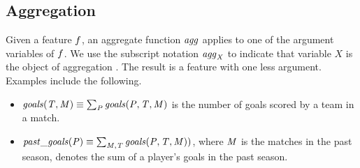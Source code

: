 \documentclass[conference]{IEEEtran}
\newcommand{\team}{T}
\newcommand{\player}{P}
\newcommand{\match}{M}
\newcommand{\plusminus}{\mbox{+/-}}
\newcommand{\aggregate}{\it{agg}}
\begin{document}
\subsection{Aggregation} Given a feature $f$, an aggregate function $\aggregate$ applies to one of the argument variables of $f$. We use the subscript notation $\aggregate_{X}$ to indicate that variable $X$ is the object of aggregation \cite{Popescul2007}. The result is a feature with one less argument. Examples include the following.

\begin{itemize}
\item $\it{goals}(\team,\match) \equiv \sum_{\player} \it{goals}(\player,\team,\match)$ is the number of goals scored by a team in a match.
\item $\it{past}\_\it{goals}(\player) \equiv \sum_{\match,\team %
} \it{goals}(\player,\team,\match))$, where $\it{M}$ is the matches in the past season, denotes the sum of a player's goals in the past season.
\end{itemize}


%
\end{document}
